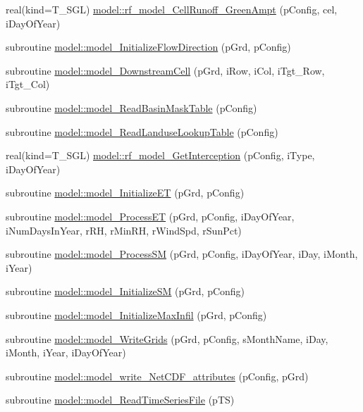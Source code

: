 \begin{DoxyCompactItemize}
\item 
real(kind=T\_\-SGL) \hyperlink{namespacemodel_a3d56722cb383673437a115933248370e}{model::rf\_\-model\_\-CellRunoff\_\-GreenAmpt} (pConfig, cel, iDayOfYear)
\item 
subroutine \hyperlink{namespacemodel_abcdfbaf903eadc9beb6cb1373cc689e8}{model::model\_\-InitializeFlowDirection} (pGrd, pConfig)
\item 
subroutine \hyperlink{namespacemodel_af029705beb69f5efe497c98df460513c}{model::model\_\-DownstreamCell} (pGrd, iRow, iCol, iTgt\_\-Row, iTgt\_\-Col)
\item 
subroutine \hyperlink{namespacemodel_afed7f38c856c81bb8ddc737e4789210d}{model::model\_\-ReadBasinMaskTable} (pConfig)
\item 
subroutine \hyperlink{namespacemodel_a42d088fe01089d49d07e112457c71f0c}{model::model\_\-ReadLanduseLookupTable} (pConfig)
\item 
real(kind=T\_\-SGL) \hyperlink{namespacemodel_a0bd4839eca85d4a4a9aaebcebea25537}{model::rf\_\-model\_\-GetInterception} (pConfig, iType, iDayOfYear)
\item 
subroutine \hyperlink{namespacemodel_ac7e2bc0bbdb50b958a89ea325128c3ac}{model::model\_\-InitializeET} (pGrd, pConfig)
\item 
subroutine \hyperlink{namespacemodel_a1c26c5d7a1bc470655af8fe1e491721a}{model::model\_\-ProcessET} (pGrd, pConfig, iDayOfYear, iNumDaysInYear, rRH, rMinRH, rWindSpd, rSunPct)
\item 
subroutine \hyperlink{namespacemodel_a27f02a2a80a6bfde66da43255ad3bf95}{model::model\_\-ProcessSM} (pGrd, pConfig, iDayOfYear, iDay, iMonth, iYear)
\item 
subroutine \hyperlink{namespacemodel_a3165f34d9843c956320ef4af2065911c}{model::model\_\-InitializeSM} (pGrd, pConfig)
\item 
subroutine \hyperlink{namespacemodel_a1909929d8c2992c9ab361ff0990bffea}{model::model\_\-InitializeMaxInfil} (pGrd, pConfig)
\item 
subroutine \hyperlink{namespacemodel_a88548b5c0028dc03fe900fc5b7aa6ce7}{model::model\_\-WriteGrids} (pGrd, pConfig, sMonthName, iDay, iMonth, iYear, iDayOfYear)
\item 
subroutine \hyperlink{namespacemodel_a1e0b3d86bd3f04da0f11d8d2eb44a18f}{model::model\_\-write\_\-NetCDF\_\-attributes} (pConfig, pGrd)
\item 
subroutine \hyperlink{namespacemodel_a3d4dfe87dab6e9b969b81dc3f41763ec}{model::model\_\-ReadTimeSeriesFile} (pTS)
\end{DoxyCompactItemize}
